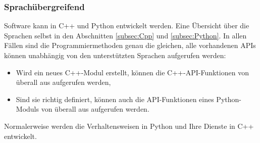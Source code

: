 \subsubsection{Sprachübergreifend}\label{subsubsec:Sprachuebergreifend}
Software kann in C++ und Python entwickelt werden. Eine Übersicht über die Sprachen selbst in den Abschnitten \autoref{subsec:Cpp} und \autoref{subsec:Python}. In allen Fällen sind die Programmiermethoden genau die gleichen, alle vorhandenen \acp{API} können unabhängig von den unterstützten Sprachen aufgerufen werden:\\
\begin{itemize}
    \item Wird ein neues C++-Modul erstellt, können die C++-\ac{API}-Funktionen von überall aus aufgerufen werden,
    \item Sind sie richtig definiert, können auch die \ac{API}-Funktionen eines Python-Moduls von überall aus aufgerufen werden.
\end{itemize}
Normalerweise werden die Verhaltensweisen in Python und Ihre Dienste in C++ entwickelt.\\

